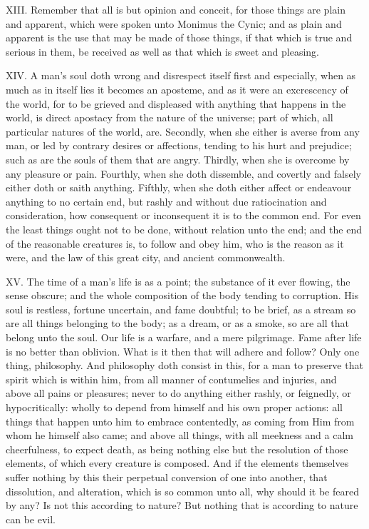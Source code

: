 XIII. Remember that all is but opinion and conceit, for those things
are plain and apparent, which were spoken unto Monimus the Cynic; and as
plain and apparent is the use that may be made of those things, if that
which is true and serious in them, be received as well as that which is
sweet and pleasing.

XIV. A man's soul doth wrong and disrespect itself first and especially,
when as much as in itself lies it becomes an aposteme, and as it were an
excrescency of the world, for to be grieved and displeased with anything
that happens in the world, is direct apostacy from the nature of the
universe; part of which, all particular natures of the world, are.
Secondly, when she either is averse from any man, or led by contrary
desires or affections, tending to his hurt and prejudice; such as are the
souls of them that are angry. Thirdly, when she is overcome by any
pleasure or pain. Fourthly, when she doth dissemble, and covertly and
falsely either doth or saith anything. Fifthly, when she doth either
affect or endeavour anything to no certain end, but rashly and without due
ratiocination and consideration, how consequent or inconsequent it is to
the common end. For even the least things ought not to be done, without
relation unto the end; and the end of the reasonable creatures is, to
follow and obey him, who is the reason as it were, and the law of this
great city, and ancient commonwealth.

XV. The time of a man's life is as a point; the substance of it ever
flowing, the sense obscure; and the whole composition of the body tending
to corruption. His soul is restless, fortune uncertain, and fame doubtful;
to be brief, as a stream so are all things belonging to the body; as a
dream, or as a smoke, so are all that belong unto the soul. Our life is a
warfare, and a mere pilgrimage. Fame after life is no better than
oblivion. What is it then that will adhere and follow? Only one thing,
philosophy. And philosophy doth consist in this, for a man to preserve
that spirit which is within him, from all manner of contumelies and
injuries, and above all pains or pleasures; never to do anything either
rashly, or feignedly, or hypocritically: wholly to depend from himself and
his own proper actions: all things that happen unto him to embrace
contentedly, as coming from Him from whom he himself also came; and above
all things, with all meekness and a calm cheerfulness, to expect death, as
being nothing else but the resolution of those elements, of which every
creature is composed. And if the elements themselves suffer nothing by
this their perpetual conversion of one into another, that dissolution, and
alteration, which is so common unto all, why should it be feared by any?
Is not this according to nature? But nothing that is according to nature
can be evil.

